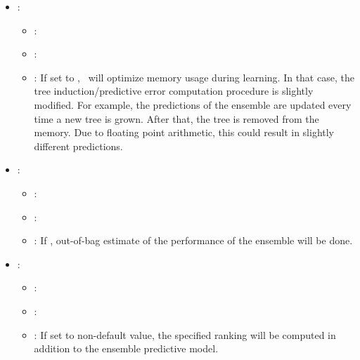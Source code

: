 \begin{itemize}
\begin{itemize}
           \end{itemize}
    \item {}:
           \begin{itemize}
                \item \optionPossibleValues{}: 
                \item \optionDefaultValue{}: 
                \item \optionDescrption{}: If set to , \clus\ will optimize memory usage during learning. In that case, the tree induction/predictive error computation procedure is slightly modified.
                For example, the predictions of the ensemble are updated every time a new tree is grown.
                After that, the tree is removed from the memory. Due to floating point arithmetic, this could result in slightly different predictions.
           \end{itemize}
    \item {}:
           \begin{itemize}
                \item \optionPossibleValues{}: 
                \item \optionDefaultValue{}: 
                \item \optionDescrption{}:  If , out-of-bag estimate of the performance of the ensemble will be done.
           \end{itemize}
    \item {}:
           \begin{itemize}
                \item \optionPossibleValues{}:  
                \item \optionDefaultValue{}: 
                \item \optionDescrption{}: If set to non-default value, the specified ranking will be computed in addition to the ensemble predictive model.
                    \begin{itemize}

\end{itemize}
\end{itemize}
\end{itemize}
